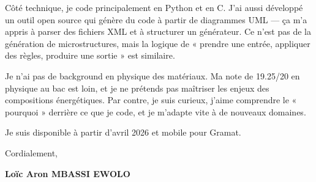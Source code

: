 \documentclass[a4paper,11pt]{article}
\begin{document}
\vspace{0.25cm}

Côté technique, je code principalement en Python et en C. J'ai aussi développé un outil open source qui génère du code à partir de diagrammes UML --- ça m'a appris à parser des fichiers XML et à structurer un générateur. Ce n'est pas de la génération de microstructures, mais la logique de « prendre une entrée, appliquer des règles, produire une sortie » est similaire.

\vspace{0.25cm}

Je n'ai pas de background en physique des matériaux. Ma note de 19.25/20 en physique au bac est loin, et je ne prétends pas maîtriser les enjeux des compositions énergétiques. Par contre, je suis curieux, j'aime comprendre le « pourquoi » derrière ce que je code, et je m'adapte vite à de nouveaux domaines.

\vspace{0.25cm}

Je suis disponible à partir d'avril 2026 et mobile pour Gramat.

\vspace{0.4cm}

Cordialement,

\vspace{0.8cm}

\textbf{Loïc Aron MBASSI EWOLO}
\end{document}
